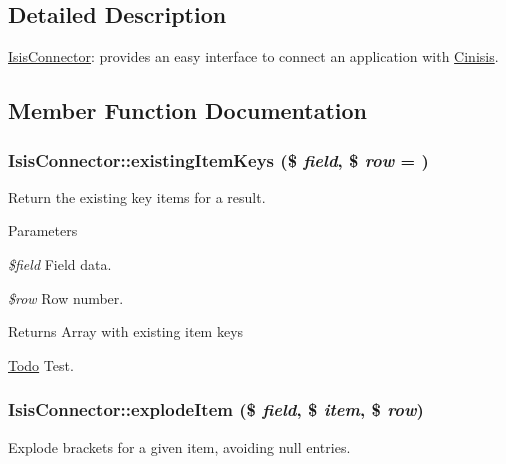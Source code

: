 \subsection{Detailed Description}
\hyperlink{classIsisConnector}{IsisConnector}: provides an easy interface to connect an application with \hyperlink{classCinisis}{Cinisis}. 

\subsection{Member Function Documentation}
\hypertarget{classIsisConnector_a10669b49c4145a86dc3662c77733d74d}{
\subsubsection[{existingItemKeys}]{\setlength{\rightskip}{0pt plus 5cm}IsisConnector::existingItemKeys (\$ {\em field}, \/  \$ {\em row} = {})}}
\label{classIsisConnector_a10669b49c4145a86dc3662c77733d74d}
Return the existing key items for a result.


\begin{DoxyParams}{Parameters}
\item[{\em \$field}]Field data.\item[{\em \$row}]Row number.\end{DoxyParams}
\begin{DoxyReturn}{Returns}
Array with existing item keys
\end{DoxyReturn}
\begin{Desc}
\item[\hyperlink{todo__todo000001}{Todo}]Test. \end{Desc}
\hypertarget{classIsisConnector_acfea4d86a683cc7455d258cdb80db478}{
\subsubsection[{explodeItem}]{\setlength{\rightskip}{0pt plus 5cm}IsisConnector::explodeItem (\$ {\em field}, \/  \$ {\em item}, \/  \$ {\em row})}}
\label{classIsisConnector_acfea4d86a683cc7455d258cdb80db478}
Explode brackets for a given item, avoiding null entries.


